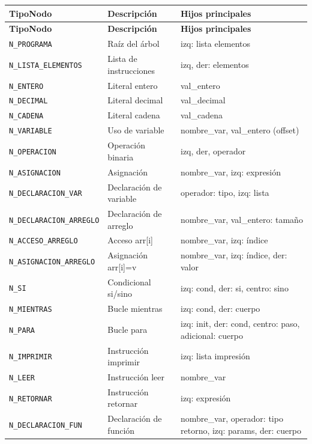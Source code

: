 \begin{table}[H]
\centering
\begin{longtable}{lp{4cm}p{7cm}}
\toprule
\textbf{TipoNodo} & \textbf{Descripción} & \textbf{Hijos principales} \\
\midrule
\endfirsthead
\toprule
\textbf{TipoNodo} & \textbf{Descripción} & \textbf{Hijos principales} \\
\midrule
\endhead
\midrule
\endfoot
\bottomrule
\endlastfoot
\texttt{N\_PROGRAMA} & Raíz del árbol & izq: lista elementos \\
\texttt{N\_LISTA\_ELEMENTOS} & Lista de instrucciones & izq, der: elementos \\
\texttt{N\_ENTERO} & Literal entero & val\_entero \\
\texttt{N\_DECIMAL} & Literal decimal & val\_decimal \\
\texttt{N\_CADENA} & Literal cadena & val\_cadena \\
\texttt{N\_VARIABLE} & Uso de variable & nombre\_var, val\_entero (offset) \\
\texttt{N\_OPERACION} & Operación binaria & izq, der, operador \\
\texttt{N\_ASIGNACION} & Asignación & nombre\_var, izq: expresión \\
\texttt{N\_DECLARACION\_VAR} & Declaración de variable & operador: tipo, izq: lista \\
\texttt{N\_DECLARACION\_ARREGLO} & Declaración de arreglo & nombre\_var, val\_entero: tamaño \\
\texttt{N\_ACCESO\_ARREGLO} & Acceso arr[i] & nombre\_var, izq: índice \\
\texttt{N\_ASIGNACION\_ARREGLO} & Asignación arr[i]=v & nombre\_var, izq: índice, der: valor \\
\texttt{N\_SI} & Condicional si/sino & izq: cond, der: si, centro: sino \\
\texttt{N\_MIENTRAS} & Bucle mientras & izq: cond, der: cuerpo \\
\texttt{N\_PARA} & Bucle para & izq: init, der: cond, centro: paso, adicional: cuerpo \\
\texttt{N\_IMPRIMIR} & Instrucción imprimir & izq: lista impresión \\
\texttt{N\_LEER} & Instrucción leer & nombre\_var \\
\texttt{N\_RETORNAR} & Instrucción retornar & izq: expresión \\
\texttt{N\_DECLARACION\_FUN} & Declaración de función & nombre\_var, operador: tipo retorno, izq: params, der: cuerpo \\

\end{longtable}
\end{table}
